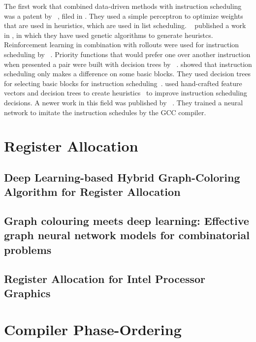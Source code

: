 The first work that combined data-driven methods with instruction scheduling was a patent by \citeauthor{tarsy1994method}~\cite{tarsy1994method}, filed in \citeyear{tarsy1994method}.
They used a simple perceptron to optimize weights that are used in heuristics, which are used in list scheduling.
\citeauthor{beaty1996using}~\cite{beaty1996using} published a work in \citeyear{beaty1996using}, in which they have used genetic algorithms to generate heuristcs.
Reinforcement learning in combination with rollouts were used for instruction scheduling by \citeauthor{mcgovern1999scheduling}~\cite{mcgovern1999scheduling,mcgovern2002building}.
Priority functions that would prefer one over another instruction when presented a pair were built with decision trees by \citeauthor{moss1998learning}~\cite{moss1998learning}.
\citeauthor{cavazos2004inducing} showed that instruction scheduling only makes a difference on some basic blocks.
They used decision trees for selecting basic blocks for instruction scheduling~\cite{cavazos2004inducing}.
\citeauthor{russell2006learning} used hand-crafted feature vectors and decision trees to create heuristics~\cite{russell2006learning} to improve instruction scheduling decisions.
A newer work in this field was published by \citeauthor{jain2019learning}~\cite{jain2019learning}.
They trained a neural network to imitate the instruction schedules by the GCC compiler.

\section{Register Allocation}
\subsection*{Deep Learning-based Hybrid Graph-Coloring Algorithm for Register Allocation}\cite{das2019deep}
\subsection*{Graph colouring meets deep learning: Effective graph neural network models for combinatorial problems}\cite{lemos2019graph}
\subsection*{Register Allocation for Intel Processor Graphics}\cite{chen2018register}

\section{Compiler Phase-Ordering}


